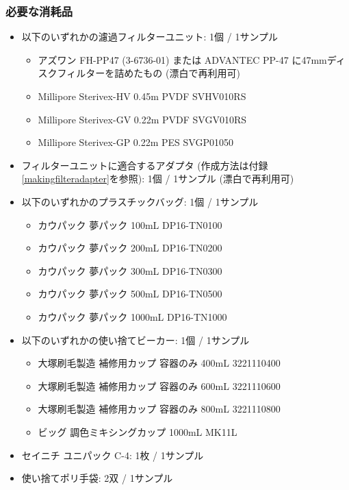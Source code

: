 \documentclass[titlepage,10pt,a4paper]{jsbook}
\begin{document}
\subsubsection{必要な消耗品}
\begin{itemize}
\item 以下のいずれかの濾過フィルターユニット: 1個 / 1サンプル
\begin{itemize}
\item アズワン FH-PP47 (3-6736-01) または ADVANTEC PP-47 に47mmディスクフィルターを詰めたもの (漂白で再利用可)
\item Millipore Sterivex-HV 0.45{\textmu}m PVDF SVHV010RS
\item Millipore Sterivex-GV 0.22{\textmu}m PVDF SVGV010RS
\item Millipore Sterivex-GP 0.22{\textmu}m PES SVGP01050
\end{itemize}
\item フィルターユニットに適合するアダプタ (作成方法は付録\ref{makingfilteradapter}を参照): 1個 / 1サンプル (漂白で再利用可)
\item 以下のいずれかのプラスチックバッグ: 1個 / 1サンプル
\begin{itemize}
\item カウパック 夢パック 100mL DP16-TN0100
\item カウパック 夢パック 200mL DP16-TN0200
\item カウパック 夢パック 300mL DP16-TN0300
\item カウパック 夢パック 500mL DP16-TN0500
\item カウパック 夢パック 1000mL DP16-TN1000
\end{itemize}
\item 以下のいずれかの使い捨てビーカー: 1個 / 1サンプル
\begin{itemize}
\item 大塚刷毛製造 補修用カップ 容器のみ 400mL 3221110400
\item 大塚刷毛製造 補修用カップ 容器のみ 600mL 3221110600
\item 大塚刷毛製造 補修用カップ 容器のみ 800mL 3221110800
\item ビッグ 調色ミキシングカップ 1000mL MK11L
\end{itemize}
\item セイニチ ユニパック C-4: 1枚 / 1サンプル
\item 使い捨てポリ手袋: 2双 / 1サンプル
\end{itemize}
\end{document}
